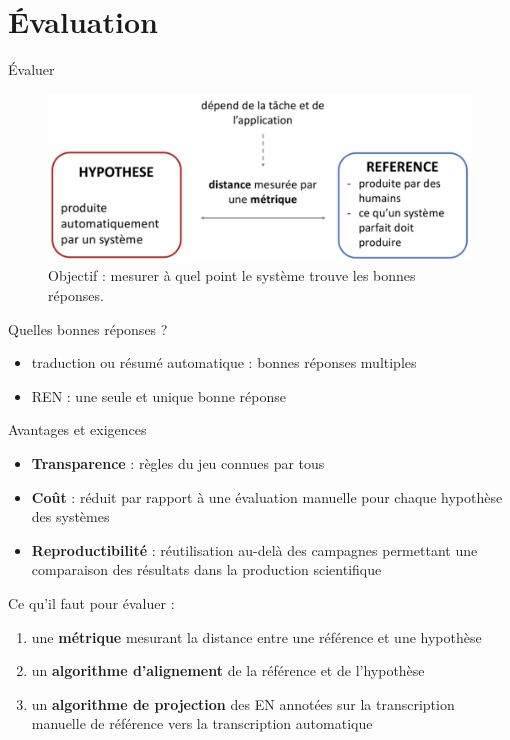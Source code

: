\documentclass[xetex,xcolor={table,usenames,dvipsnames}]{beamer}
\newcommand{\bolder}[1]{{\color{purple}\bfseries#1}}
\begin{document}
\section{Évaluation}

\begin{frame}{Évaluer}
										\begin{figure}[h] %
		\centering
		\includegraphics[width=.9\linewidth]{img/evaluation.png}
		\caption{Objectif : mesurer à quel point le système trouve les \og{}bonnes réponses\fg{}.}
		\label{fig:ling_out_TAL}
	\end{figure}
	
	Quelles \og{}bonnes réponses\fg{} ?
	\begin{itemize}
		\item traduction ou résumé automatique : bonnes réponses multiples
		\item \textsc{REN} : une seule et unique bonne réponse
	\end{itemize}
\end{frame}

\begin{frame}{Avantages et exigences}
	\begin{itemize}
		\item \textcolor{deepblue}{\textbf{Transparence}} : \og{}règles du jeu\fg{} connues par tous
		\item \textcolor{deepblue}{\textbf{Coût}} : réduit par rapport à une évaluation manuelle pour chaque hypothèse des systèmes
		\item \textcolor{deepblue}{\textbf{Reproductibilité}} : réutilisation au-delà des campagnes permettant une comparaison des résultats dans la production scientifique
	\end{itemize}
	
	Ce qu'il faut pour évaluer : 
	\begin{enumerate}
		\item une \bolder{métrique} mesurant la distance entre une référence et une hypothèse
		\item un \bolder{algorithme d'alignement} de la référence et de l'hypothèse
		\item un \bolder{algorithme de projection} des \textsc{EN} annotées sur la transcription manuelle de référence vers la transcription automatique
	\end{enumerate}
\end{frame}
\end{document}
